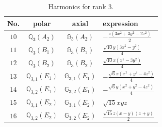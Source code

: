 \documentclass[fleqn,8pt,landscape]{jsarticle}
\begin{document}
\begin{table}[ht!]
\begin{center}
\caption{Harmonics for rank 3.}
\renewcommand{\arraystretch}{1.3}
\begin{tabular}{cccl} \hline \hline
No. & polar & axial & expression \\ \hline
$ 10 $ & $ \mathbb{Q}_{3}(A_{2}) $ & $ \mathbb{G}_{3}(A_{2}) $ & $ - \frac{z \left(3 x^{2} + 3 y^{2} - 2 z^{2}\right)}{2} $ \\
$ 11 $ & $ \mathbb{Q}_{3}(B_{1}) $ & $ \mathbb{G}_{3}(B_{1}) $ & $ \frac{\sqrt{10} y \left(3 x^{2} - y^{2}\right)}{4} $ \\
$ 12 $ & $ \mathbb{Q}_{3}(B_{2}) $ & $ \mathbb{G}_{3}(B_{2}) $ & $ \frac{\sqrt{10} x \left(x^{2} - 3 y^{2}\right)}{4} $ \\
$ 13 $ & $ \mathbb{Q}_{3,1}(E_{1}) $ & $ \mathbb{G}_{3,1}(E_{1}) $ & $ - \frac{\sqrt{6} x \left(x^{2} + y^{2} - 4 z^{2}\right)}{4} $ \\
$ 14 $ & $ \mathbb{Q}_{3,2}(E_{1}) $ & $ \mathbb{G}_{3,2}(E_{1}) $ & $ - \frac{\sqrt{6} y \left(x^{2} + y^{2} - 4 z^{2}\right)}{4} $ \\
$ 15 $ & $ \mathbb{Q}_{3,1}(E_{2}) $ & $ \mathbb{G}_{3,1}(E_{2}) $ & $ \sqrt{15} x y z $ \\
$ 16 $ & $ \mathbb{Q}_{3,2}(E_{2}) $ & $ \mathbb{G}_{3,2}(E_{2}) $ & $ \frac{\sqrt{15} z \left(x - y\right) \left(x + y\right)}{2} $ \\
 \hline \hline
\end{tabular}
\end{center}
\end{table}
\end{document}
